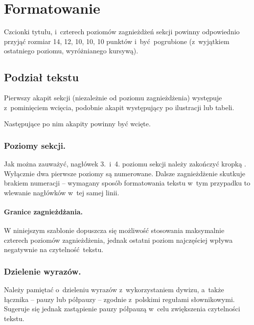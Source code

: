 \section{Formatowanie}
\label{sec:formatting}

Czcionki tytułu, i~czterech poziomów zagnieżdżeń sekcji powinny odpowiednio przyjąć rozmiar 14, 12, 10, 10, 10 punktów i~być pogrubione (z~wyjątkiem ostatniego poziomu, wyróżnianego kursywą).

\subsection{Podział tekstu}
\label{subsec:textDivision}

Pierwszy akapit sekcji (niezależnie od poziomu zagnieżdżenia) występuje z~pominięciem wcięcia, podobnie akapit występujący po ilustracji lub tabeli.

Następujące po nim akapity powinny być wcięte.

\subsubsection{Poziomy sekcji.}
\label{subsubsec:levels}

Jak można zauważyć, nagłówek 3.~i~4. poziomu sekcji należy zakończyć kropką \cite{ref:lncs}. Wyłącznie dwa pierwsze poziomy są numerowane. Dalsze zagnieżdżenie skutkuje brakiem numeracji -- wymagany sposób formatowania tekstu w~tym przypadku to wlewanie nagłówków w~tej samej linii.

\paragraph{Granice zagnieżdżania.}
\label{par:nestingLimits}

W niniejszym szablonie dopuszcza się możliwość stosowania maksymalnie czterech poziomów zagnieżdżenia, jednak ostatni poziom najczęściej wpływa negatywnie na czytelność tekstu.

\subsubsection{Dzielenie wyrazów.}
\label{subsubsec:wordbreak}

Należy pamiętać o~dzieleniu wyrazów z~wykorzystaniem dywizu, a~także łącznika -- pauzy lub półpauzy -- zgodnie z~polskimi regułami słownikowymi. Sugeruje się jednak zastąpienie pauzy półpauzą w~celu zwiększenia czytelności tekstu.

